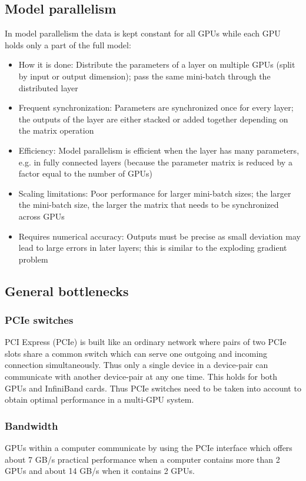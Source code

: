 \documentclass{article} %
\begin{document}
\subsection{Model parallelism}
In model parallelism the data is kept constant for all GPUs while each GPU holds only a part of the full model:
\begin{itemize}
	\item How it is done: Distribute the parameters of a layer on multiple GPUs (split by input or output dimension); pass the same mini-batch through the distributed layer
	\item Frequent synchronization: Parameters are synchronized once for every layer; the outputs of the layer are either stacked or added together depending on the matrix operation
	\item Efficiency: Model parallelism is efficient when the layer has many parameters, e.g. in fully connected layers (because the parameter matrix is reduced by a factor equal to the number of GPUs)
	\item Scaling limitations: Poor performance for larger mini-batch sizes; the larger the mini-batch size, the larger the matrix that needs to be synchronized across GPUs
	\item Requires numerical accuracy: Outputs must be precise as small deviation may lead to large errors in later layers; this is similar to the exploding gradient problem \citep{hochreiter2001gradient}
\end{itemize}

\subsection{General bottlenecks}

\subsubsection{PCIe switches}

PCI Express (PCIe) is built like an ordinary network where pairs of two PCIe slots share a common switch which can serve one outgoing and incoming connection simultaneously. Thus only a single device in a device-pair can communicate with another device-pair at any one time. This holds for both GPUs and InfiniBand cards. Thus PCIe switches need to be taken into account to obtain optimal performance in a multi-GPU system.

\subsubsection{Bandwidth}
GPUs within a computer communicate by using the PCIe interface which offers about 7 GB/s practical performance when a computer contains more than 2 GPUs and about 14 GB/s when it contains 2 GPUs. 
\end{document}
